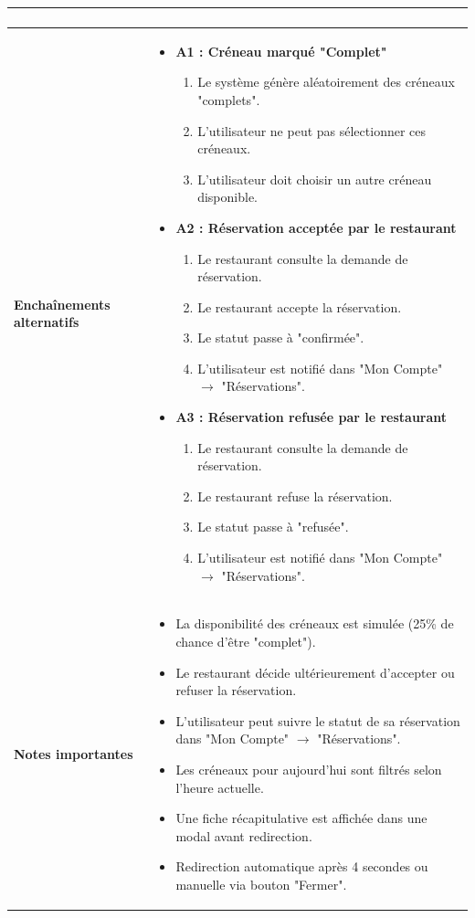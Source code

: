 \begin{longtable}{|p{6cm}|p{10cm}|}
\begin{itemize}
\begin{enumerate}
\end{enumerate}
\end{itemize} \\ 
\hline
\rule{0pt}{12pt} \textbf{Enchaînements alternatifs} & \rule{0pt}{8pt}
\begin{itemize}
\setlength{\itemsep}{3pt}
\item \textbf{A1 : Créneau marqué "Complet"}
\begin{enumerate}
\item Le système génère aléatoirement des créneaux "complets".
\item L'utilisateur ne peut pas sélectionner ces créneaux.
\item L'utilisateur doit choisir un autre créneau disponible.
\end{enumerate}
\item \textbf{A2 : Réservation acceptée par le restaurant}
\begin{enumerate}
\item Le restaurant consulte la demande de réservation.
\item Le restaurant accepte la réservation.
\item Le statut passe à "confirmée".
\item L'utilisateur est notifié dans "Mon Compte" $\rightarrow$ "Réservations".
\end{enumerate}
\item \textbf{A3 : Réservation refusée par le restaurant}
\begin{enumerate}
\item Le restaurant consulte la demande de réservation.
\item Le restaurant refuse la réservation.
\item Le statut passe à "refusée".
\item L'utilisateur est notifié dans "Mon Compte" $\rightarrow$ "Réservations".
\end{enumerate}
\end{itemize} \\ 
\hline
\rule{0pt}{12pt} \textbf{Notes importantes} & \rule{0pt}{10pt}
\begin{itemize}
\setlength{\itemsep}{2pt}
\item La disponibilité des créneaux est simulée (25\% de chance d'être "complet").
\item Le restaurant décide ultérieurement d'accepter ou refuser la réservation.
\item L'utilisateur peut suivre le statut de sa réservation dans "Mon Compte" $\rightarrow$ "Réservations".
\item Les créneaux pour aujourd'hui sont filtrés selon l'heure actuelle.
\item Une fiche récapitulative est affichée dans une modal avant redirection.
\item Redirection automatique après 4 secondes ou manuelle via bouton "Fermer".
\end{itemize} \\ 
\hline
\end{longtable}